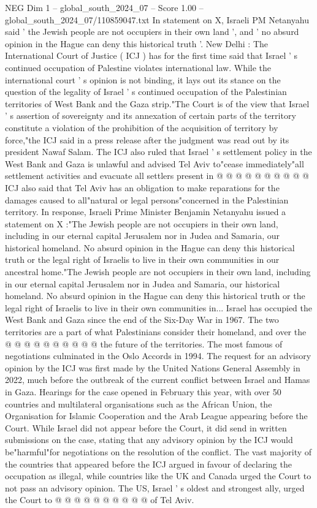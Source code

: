 \begin{textsample}{NEG Dim 1 – global\_south\_2024\_07 – Score 1.00 – global\_south\_2024\_07/110859047.txt}  \label{ex:f1_neg_272}
In statement on X, Israeli PM Netanyahu said ' the Jewish people are not occupiers in their own land ', and ' no absurd opinion in the Hague can deny this historical truth '.
New Delhi : The International Court of Justice ( ICJ ) has for the first time said that Israel ' s continued occupation of Palestine violates international law.
While the international court ' s opinion is not binding, it lays out its stance on the question of the legality of Israel ' s continued occupation of the Palestinian territories of West Bank and the Gaza strip."The Court is of the view that Israel ' s assertion of sovereignty and its annexation of certain parts of the territory constitute a violation of the prohibition of the acquisition of territory by force,"the ICJ said in a press release after the judgment was read out by its president Nawaf Salam.
The ICJ also ruled that Israel ' s settlement policy in the West Bank and Gaza is unlawful and advised Tel Aviv to"cease immediately"all settlement activities and evacuate all settlers present in @ @ @ @ @ @ @ @ @ @ ICJ also said that Tel Aviv has an obligation to make reparations for the damages caused to all"natural or legal persons"concerned in the Palestinian territory.
In response, Israeli Prime Minister Benjamin Netanyahu issued a statement on X :"The Jewish people are not occupiers in their own land, including in our eternal capital Jerusalem nor in Judea and Samaria, our historical homeland.
No absurd opinion in the Hague can deny this historical truth or the legal right of Israelis to live in their own communities in our ancestral home."The Jewish people are not occupiers in their own land, including in our eternal capital Jerusalem nor in Judea and Samaria, our historical homeland.
No absurd opinion in the Hague can deny this historical truth or the legal right of Israelis to live in their own communities in...
Israel has occupied the West Bank and Gaza since the end of the Six-Day War in 1967.
The two territories are a part of what Palestinians consider their homeland, and over the @ @ @ @ @ @ @ @ @ @ the future of the territories.
The most famous of negotiations culminated in the Oslo Accords in 1994.
The request for an advisory opinion by the ICJ was first made by the United Nations General Assembly in 2022, much before the outbreak of the current conflict between Israel and Hamas in Gaza.
Hearings for the case opened in February this year, with over 50 countries and multilateral organisations such as the African Union, the Organisation for Islamic Cooperation and the Arab League appearing before the Court.
While Israel did not appear before the Court, it did send in written submissions on the case, stating that any advisory opinion by the ICJ would be"harmful"for negotiations on the resolution of the conflict.
The vast majority of the countries that appeared before the ICJ argued in favour of declaring the occupation as illegal, while countries like the UK and Canada urged the Court to not pass an advisory opinion.
The US, Israel ' s oldest and strongest ally, urged the Court to @ @ @ @ @ @ @ @ @ @ of Tel Aviv.

\end{textsample}
